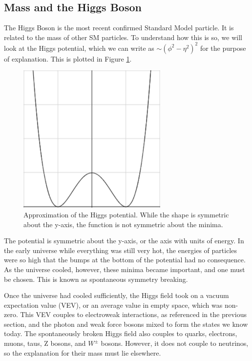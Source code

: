 \subsection{Mass and the Higgs Boson}
The Higgs Boson is the most recent confirmed Standard Model particle. It is related to the mass of other SM particles. To understand how this is so, we will look at the Higgs potential, which we can write as $\sim (\phi^2 - \eta^2)^2$ for the purpose of explanation. This is plotted in Figure \ref{Fig:Intro:HiggsPot}.
\begin{figure}[h]
    \centering
        \includegraphics[width=0.66\textwidth]{F1/higsspot}
        \caption{Approximation of the Higgs potential. While the shape is symmetric about the y-axis, the function is not symmetric about the minima.}
        \label{Fig:Intro:HiggsPot}
\end{figure}
The potential is symmetric about the y-axis, or the axis with units of energy. In the early universe while everything was still very hot, the energies of particles were so high that the bumps at the bottom of the potential had no consequence. As the universe cooled, however, these minima became important, and one must be chosen. This is known as spontaneous symmetry breaking.

Once the universe had cooled sufficiently, the Higgs field took on a vacuum expectation value (VEV), or an average value in empty space, which was non-zero. This VEV couples to electroweak interactions, as referenced in the previous section, and the photon and weak force bosons mixed to form the states we know today. The spontaneously broken Higgs field also couples to quarks, electrons, muons, taus, Z bosons, and $W^{\pm}$ bosons. However, it does not couple to neutrinos, so the explanation for their mass must lie elsewhere.

